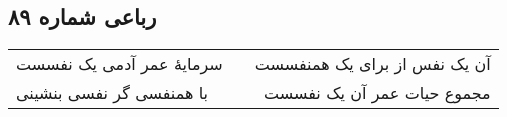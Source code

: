 \begin{center}
\section*{رباعی شماره ۸۹}
\label{sec:sh089}
\begin{longtable}{l p{0.5cm} r}
سرمایهٔ عمر آدمی یک نفسست
&&
آن یک نفس از برای یک همنفسست
\\
با همنفسی گر نفسی بنشینی
&&
مجموع حیات عمر آن یک نفسست
\\
\end{longtable}
\end{center}
